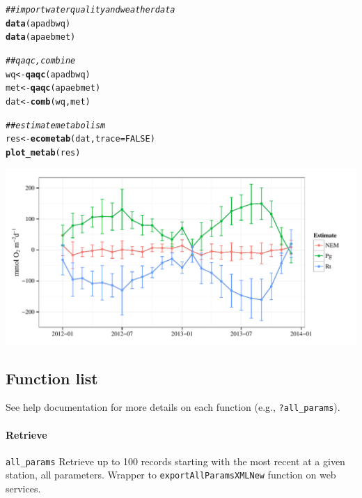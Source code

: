\documentclass[10pt,letterpaper]{article}\usepackage[]{graphicx}\usepackage[]{color}
\makeatletter
\def\maxwidth{ %
  \ifdim\Gin@nat@width>\linewidth
    \linewidth
  \else
    \Gin@nat@width
  \fi
}
\newcommand{\hlnum}[1]{\textcolor[rgb]{0.686,0.059,0.569}{#1}}%
\newcommand{\hlcom}[1]{\textcolor[rgb]{0.678,0.584,0.686}{\textit{#1}}}%
\newcommand{\hlstd}[1]{\textcolor[rgb]{0.345,0.345,0.345}{#1}}%
\newcommand{\hlkwb}[1]{\textcolor[rgb]{0.69,0.353,0.396}{#1}}%
\newcommand{\hlkwc}[1]{\textcolor[rgb]{0.333,0.667,0.333}{#1}}%
\newcommand{\hlkwd}[1]{\textcolor[rgb]{0.737,0.353,0.396}{\textbf{#1}}}%
\newenvironment{kframe}{%
 \def\at@end@of@kframe{}%
 \ifinner\ifhmode%
  \def\at@end@of@kframe{\end{minipage}}%
  \begin{minipage}{\columnwidth}%
 \fi\fi%
 \def\FrameCommand##1{\hskip\@totalleftmargin \hskip-\fboxsep
 \colorbox{shadecolor}{##1}\hskip-\fboxsep
     \hskip-\linewidth \hskip-\@totalleftmargin \hskip\columnwidth}%
 \MakeFramed {\advance\hsize-\width
   \@totalleftmargin\z@ \linewidth\hsize
   \@setminipage}}%
 {\par\unskip\endMakeFramed%
 \at@end@of@kframe}
\newenvironment{knitrout}{}{} %
\makeatother
\begin{document}
\begin{knitrout}
\color{fgcolor}\begin{kframe}
\begin{alltt}
\hlcom{## import water quality and weather data}
\hlkwd{data}\hlstd{(apadbwq)}
\hlkwd{data}\hlstd{(apaebmet)}

\hlcom{## qaqc, combine}
\hlstd{wq} \hlkwb{<-} \hlkwd{qaqc}\hlstd{(apadbwq)}
\hlstd{met} \hlkwb{<-} \hlkwd{qaqc}\hlstd{(apaebmet)}
\hlstd{dat} \hlkwb{<-} \hlkwd{comb}\hlstd{(wq, met)}

\hlcom{## estimate metabolism}
\hlstd{res} \hlkwb{<-} \hlkwd{ecometab}\hlstd{(dat,} \hlkwc{trace} \hlstd{=} \hlnum{FALSE}\hlstd{)}
\hlkwd{plot_metab}\hlstd{(res)}
\end{alltt}
\end{kframe}

{\centering \includegraphics[width=\maxwidth]{figure/unnamed-chunk-22} 

}



\end{knitrout}

\subsection*{Function list}

See help documentation for more details on each function (e.g., \texttt{?all\_params}).

\paragraph{Retrieve}

\texttt{all\_params} Retrieve up to 100 records starting with the most recent at a given station, all parameters.  Wrapper to \texttt{exportAllParamsXMLNew} function on web services. 
\end{document}

